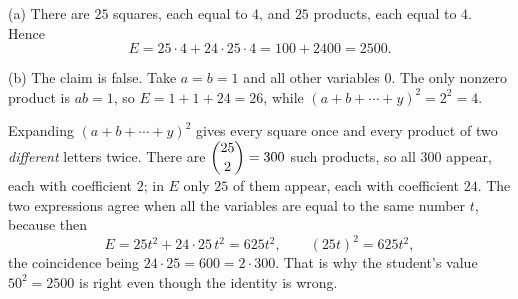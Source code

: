 (a) There are $25$ squares, each equal to $4$, and $25$ products, each equal to $4$. Hence
\[
E=25\cdot4+24\cdot25\cdot4=100+2400=\boxed{2500}.
\]

(b) The claim is false. Take $a=b=1$ and all other variables $0$. The only nonzero product is $ab=1$, so $E=1+1+24=26$, while $(a+b+\cdots+y)^2=2^2=4$.

Expanding $(a+b+\cdots+y)^2$ gives every square once and every product of two \emph{different} letters twice. There are $\dbinom{25}{2}=300$ such products, so all $300$ appear, each with coefficient $2$; in $E$ only $25$ of them appear, each with coefficient $24$. The two expressions agree when all the variables are equal to the same number $t$, because then
\[
E=25t^2+24\cdot25\,t^2=625t^2,\qquad (25t)^2=625t^2,
\]
the coincidence being $24\cdot25=600=2\cdot300$. That is why the student's value $50^2=2500$ is right even though the identity is wrong.
